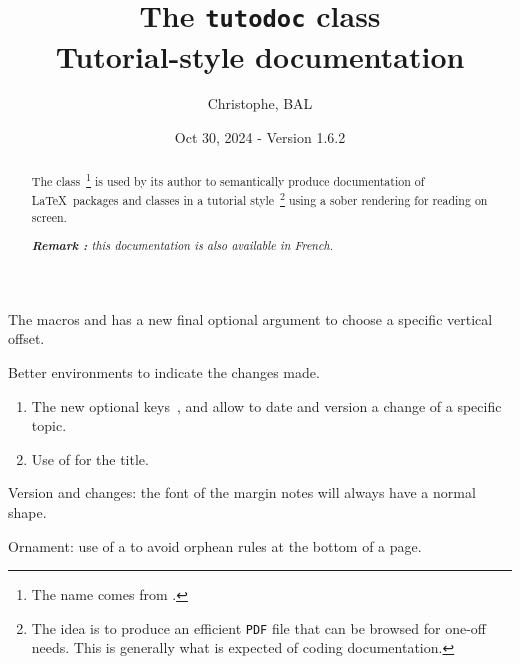 \title{The \texttt{tutodoc} class \\ Tutorial-style documentation}
\author{Christophe, BAL}
\date{Oct 30, 2024 - Version 1.6.2}

\maketitle

\begin{abstract}
    The \thisproj{} class\,%
    \footnote{
        The name comes from .
    }
    is used by its author to semantically produce documentation of \LaTeX\ packages and classes in a tutorial style\,%
    \footnote{
        The idea is to produce an efficient \texttt{PDF} file that can be browsed for one-off needs. This is generally what is expected of coding documentation.
    }
    using a sober rendering for reading on screen.

    \smallskip

    \noindent
    \emph{\textbf{Remark :} this documentation is also available in French.}
\end{abstract}

\medskip

\begin{center}
\small
\begin{minipage}{.9\textwidth}
\begin{tdocnote}
\small

\begin{tdocnew}
	\item The macros  and  has a new final optional argument  to choose a specific vertical offset.

	\item Better environments to indicate the changes made.
	\begin{enumerate}
        \item The new optional keys \,,  and  allow to date and version a change of a specific topic.

        \item Use of  for the title.
	\end{enumerate}
\end{tdocnew}


\begin{tdocupdate}
	\item Version and changes: the font of the margin notes will always have a normal shape.

	\item Ornament: use of a \tdocinlatex{\cleaders} to avoid orphean rules at the bottom of a page.
\end{tdocupdate}
\end{tdocnote}
\end{minipage}
\end{center}


